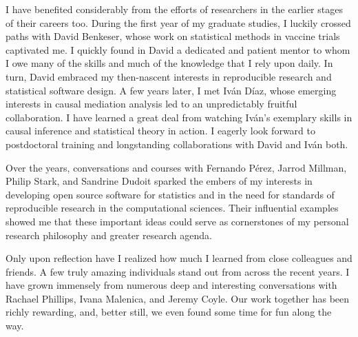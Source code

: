 \documentclass{ucbthesis}
\begin{document}
\begin{frontmatter}
\begin{acknowledgements}
I have benefited considerably from the efforts of researchers in the earlier
stages of their careers too. During the first year of my graduate studies,
I luckily crossed paths with David Benkeser, whose work on statistical methods
in vaccine trials captivated me. I quickly found in David a dedicated and
patient mentor to whom I owe many of the skills and much of the knowledge that
I rely upon daily. In turn, David embraced my then-nascent interests in
reproducible research and statistical software design.
A few years later, I met Iv\'{a}n D\'{i}az, whose emerging interests in causal
mediation analysis led to an unpredictably fruitful collaboration. I have
learned a great deal from watching Iv\'{a}n's exemplary skills in causal
inference and statistical theory in action.
I eagerly look forward to postdoctoral training and longstanding collaborations
with David and Iv\'{a}n both.

Over the years, conversations and courses with Fernando P{\'e}rez, Jarrod
Millman, Philip Stark, and Sandrine Dudoit sparked the embers of my interests in
developing open source software for statistics and in the need for standards of
reproducible research in the computational sciences. Their influential examples
showed me that these important ideas could serve as cornerstones of my personal
research philosophy and greater research agenda.

Only upon reflection have I realized how much I learned from close colleagues
and friends. A few truly amazing individuals stand out from across the recent
years. I have grown immensely from numerous deep and interesting conversations
with Rachael Phillips, Ivana Malenica, and Jeremy Coyle. Our work together has
been richly rewarding, and, better still, we even found some time for fun along
the way.

\end{acknowledgements}

\end{frontmatter}

\pagestyle{headings}








\printbibliography
\end{document}
